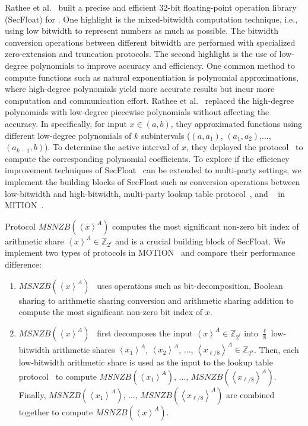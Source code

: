 Rathee et al.~\cite{rathee2022secfloat} built a precise and efficient 32-bit floating-point operation library (SecFloat) for \twopc. One highlight is the mixed-bitwidth computation technique, i.e., using low bitwidth to represent numbers as much as possible. The bitwidth conversion operations between different bitwidth are performed with specialized zero-extension and truncation \twopc protocols.
The second highlight is the use of low-degree polynomials to improve accuracy and efficiency.
One common method to compute functions such as natural exponentiation is polynomial approximations, where high-degree polynomials yield more accurate results but incur more computation and communication effort. Rathee et al.~\cite{rathee2022secfloat} replaced the high-degree polynomials with low-degree piecewise polynomials without affecting the accuracy. In specifically, for input $x\in \left(a,b\right) $, they approximated functions using different low-degree polynomials of $k$ subintervals ($\left(a, a_1\right) $, $\left(a_1, a_2\right)  $,$\ldots$, $\left(a_{k-1}, b\right) $). To determine the active interval of $x$, they deployed the \lut protocol~\cite{dessouky2017pushing} to compute the corresponding polynomial coefficients.
To explore if the efficiency improvement techniques of SecFloat~\cite{rathee2022secfloat} can be extended to multi-party settings, we implement the building blocks of SecFloat such as conversion operations between low-bitwidth and high-bitwidth, multi-party lookup table protocol~\cite{keller2017faster}, and \msnzb~\cite{rathee2021sirnn} in MITION~\cite{braun2022motion}.

Protocol $MSNZB\left(\left\langle x\right\rangle^A\right) $ computes the most significant non-zero bit index of arithmetic share $\left\langle x\right\rangle^A \in \mathbb{Z} _{2^{\ell}}$ and is a crucial building block of SecFloat.
We implement two types of \msnzb protocols in MOTION~\cite{braun2022motion} and compare their performance difference:
\begin{enumerate}
    \item $MSNZB\left(\left\langle x\right\rangle^A\right) $~\cite{aliasgari2012secure} uses operations such as bit-decomposition, Boolean sharing to arithmetic sharing conversion and arithmetic sharing addition to compute the most significant non-zero bit index of $x$.
    \item $MSNZB\left(\left\langle x\right\rangle^A\right) $~\cite{rathee2021sirnn} first decomposes the input $\left\langle x\right\rangle^A \in \mathbb{Z} _{2^{\ell}}$ into $\frac{\ell}{8}$ low-bitwidth arithmetic shares $\left\langle x_1\right\rangle^A$, $\left\langle x_2\right\rangle^A$, $\ldots$,  $\left\langle x_{\ell/8}\right\rangle^A\in \mathbb{Z} _{2^{{8}}} $. Then, each low-bitwidth arithmetic share is used as the input to the lookup table protocol~\cite{keller2017faster} to compute $MSNZB\left(\left\langle x_1\right\rangle^A\right) $, $\ldots$, $MSNZB\left(\left\langle x_{\ell/8}\right\rangle^A\right) $. Finally, $MSNZB\left(\left\langle x_1\right\rangle^A\right) $, $\ldots$, $MSNZB\left(\left\langle x_{\ell/8}\right\rangle^A\right) $ are combined together to compute $MSNZB\left(\left\langle x\right\rangle^A\right) $.
\end{enumerate}


